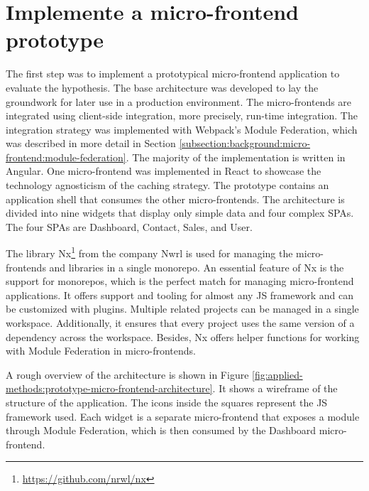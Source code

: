 \section{Implemente a micro-frontend prototype}\label{section:applied-methods:prototypical-implementation}

The first step was to implement a prototypical micro-frontend application to evaluate the hypothesis. The base architecture was developed to lay the groundwork for later use in a production environment. The micro-frontends are integrated using client-side integration, more precisely, run-time integration. The integration strategy was implemented with Webpack's Module Federation, which was described in more detail in Section \ref{subsection:background:micro-frontend:module-federation}. The majority of the implementation is written in Angular. One micro-frontend was implemented in React to showcase the technology agnosticism of the caching strategy. The prototype contains an application shell that consumes the other micro-frontends. The architecture is divided into nine widgets that display only simple data and four complex 
\acp{SPA}. The four \acp{SPA} are Dashboard, Contact, Sales, and User.

\bigskip

\noindent The library Nx\footnote{\url{https://github.com/nrwl/nx}} from the company Nwrl is used for managing the micro-frontends and libraries in a single monorepo. An essential feature of Nx is the support for monorepos, which is the perfect match for managing micro-frontend applications. It offers support and tooling for almost any \ac{JS} framework and can be customized with plugins. Multiple related projects can be managed in a single workspace. Additionally, it ensures that every project uses the same version of a dependency across the workspace. Besides, Nx offers helper functions for working with Module Federation in micro-frontends. \cite{misc:-:applied-methods:intro-to-nx}

\bigskip

\noindent A rough overview of the architecture is shown in Figure \ref{fig:applied-methods:prototype-micro-frontend-architecture}. It shows a wireframe of the structure of the application. The icons inside the squares represent the \ac{JS} framework used. Each widget is a separate micro-frontend that exposes a module through Module Federation, which is then consumed by the Dashboard micro-frontend.


